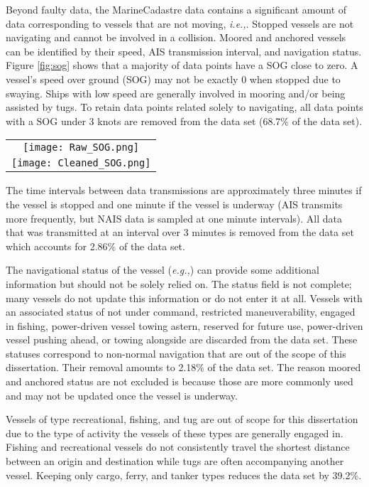 \documentclass[twoside,symmetric,notoc]{tufte-book}
\newcommand{\hairsp}{\hspace{1pt}}
\newcommand{\ie}{\textit{i.\hairsp{}e.,}\hspace{3pt}}
\newcommand{\eg}{\textit{e.\hairsp{}g.,}\hspace{3pt}}
\begin{document}
\par{
Beyond faulty data, the MarineCadastre data contains a significant amount of data corresponding to vessels that are not moving, \ie{stop segments}. Stopped vessels are not navigating and cannot be involved in a collision. Moored and anchored vessels can be identified by their speed, AIS transmission interval, and navigation status. Figure \ref{fig:sog} shows that a majority of data points have a SOG close to zero. A vessel's speed over ground (SOG) may not be exactly 0 when stopped due to swaying. Ships with low speed are generally involved in mooring and/or being assisted by tugs. To retain data points related solely to navigating, all data points with a SOG under 3 knots are removed from the data set (68.7\% of the data set). 
}
\begin{figure*}
\begin{tabular}{c}
  \texttt{[image: Raw\_SOG.png]}\\
  \texttt{[image: Cleaned\_SOG.png]}\\
\end{tabular}
\caption{The majority of all data points correspond to a stopped vessel. When underway, most vessels operate at a SOG between 3 and 20 knots.}
\label{fig:sog}
\end{figure*}
\par{%
The time intervals between data transmissions are approximately three minutes if the vessel is stopped and one minute if the vessel is underway (AIS transmits more frequently, but NAIS data is sampled at one minute intervals). All data that was transmitted at an interval over 3 minutes is removed from the data set which accounts for 2.86\% of the data set.
}
\par{%
The navigational status of the vessel (\eg{ underway using engine, moored, not under command}) can provide some additional information but should not be solely relied on. The status field is not complete; many vessels do not update this information or do not enter it at all. Vessels with an associated status of not under command, restricted maneuverability, engaged in fishing, power-driven vessel towing astern, reserved for future use, power-driven vessel pushing ahead, or towing alongside are discarded from the data set. These statuses correspond to non-normal navigation that are out of the scope of this dissertation. Their removal amounts to 2.18\% of the data set. The reason moored and anchored status are not excluded is because those are more commonly used and may not be updated once the vessel is underway. 
}
\par{%
Vessels of type recreational, fishing, and tug are out of scope for this dissertation due to the type of activity the vessels of these types are generally engaged in. Fishing and recreational vessels do not consistently travel the shortest distance between an origin and destination while tugs are often  accompanying another vessel. Keeping only cargo, ferry, and tanker types reduces the data set by 39.2\%.
}
\end{document}
